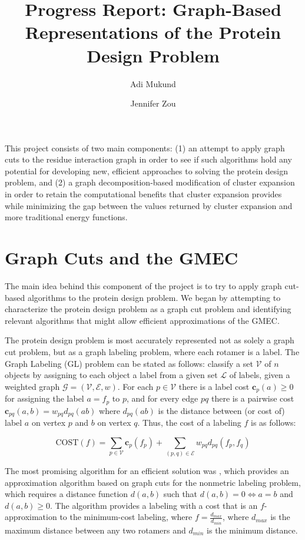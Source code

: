 \documentclass[11pt]{article}
\title{\textbf{Progress Report: Graph-Based Representations of the Protein 
		Design Problem}}
\author{Adi Mukund \and Jennifer Zou}
\date{}
\begin{document}
	
	\maketitle

	This project consists of two main components: (1) an attempt to apply graph
	cuts to the residue interaction graph in order to see if such algorithms 
	hold any potential for developing new, efficient approaches to solving the
	protein design problem, and (2) a graph decomposition-based modification of
	cluster expansion in order to retain the computational benefits that cluster
	expansion provides while minimizing the gap between the values returned by
	cluster expansion and more traditional energy functions. 

	
	\section{Graph Cuts and the GMEC}
	
	The main idea behind this component of the project is to try to apply graph
	cut-based algorithms to the protein design problem. We began by attempting
	to characterize the protein design problem as a graph cut problem and 
	identifying relevant algorithms that might allow efficient approximations
	of the GMEC. 
	
	The protein design problem is most accurately represented not as solely a
	graph cut problem, but as a graph labeling problem, where each rotamer is a label.
	The Graph Labeling (GL) problem can be stated as follows: classify a set 
	$\mathcal{V}$ of $n$ objects by assigning to each object a label from a given
	set $\mathcal{L}$ of labels, given a weighted graph
	$\mathcal{G}=(\mathcal{V},\mathcal{E},w)$. For each $p \in \mathcal{V}$ there
	is a label cost $\textbf{c}_{p}(a) \geq 0$ for assigning the label $a=f_p$ to
	$p$, and for every edge $pq$ there is a pairwise cost
	$\textbf{c}_{pq}(a,b) =  w_{pq}d_{pq}(ab)$ where $d_{pq}(ab)$ is the distance
	between (or cost of) label $a$ on vertex $p$ and $b$ on vertex $q$. Thus,
	the cost of a labeling $f$ is as follows:
		
	\begin{equation} \label{k_cost}
			\text{COST}(f) = 
			\sum\limits_{p \in \mathcal{V}} \textbf{c}_{p}(f_p) + 
			\sum\limits_{(p,q) \in \mathcal{E}} w_{pq}d_{pq}(f_p,f_q)
		\end{equation}
		
	
	The most promising algorithm for an efficient solution was \cite{Karmarkar}, 
	which provides an approximation algorithm based on graph cuts for the 
	nonmetric labeling problem, which requires a distance function $d(a,b)$ such
	that $d(a,b)=0 \iff a=b$ and $d(a,b) \geq 0$. The algorithm provides a labeling 
	with a cost that is an $f$-approximation to the minimum-cost labeling, where
	$f = \frac{d_{max}}{d_{min}}$, where $d_{max}$ is the maximum distance between
	any two rotamers and $d_{min}$ is the minimum distance. 
	
\end{document}
